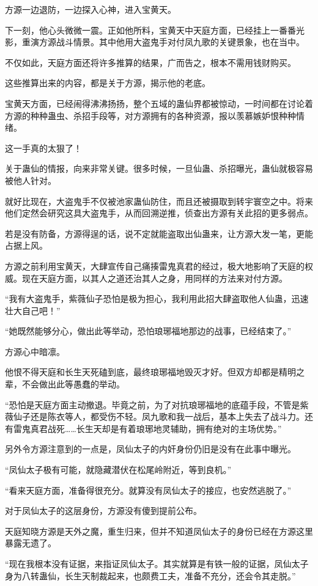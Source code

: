 \begin{this_body}
方源一边退防，一边探入心神，进入宝黄天。

下一刻，他心头微微一震。正如他所料，宝黄天中天庭方面，已经挂上一番番光影，重演方源战斗情景。其中他用大盗鬼手对付凤九歌的关键景象，也在当中。

不仅如此，天庭方面还将许多推算的结果，广而告之，根本不需用钱财购买。

这些推算出来的内容，都是关于方源，揭示他的老底。

宝黄天方面，已经闹得沸沸扬扬，整个五域的蛊仙界都被惊动，一时间都在讨论着方源的种种蛊虫、杀招手段等，对方源拥有的各种资源，报以羡慕嫉妒恨种种情绪。

这一手真的太狠了！

关于蛊仙的情报，向来非常关键。很多时候，一旦仙蛊、杀招曝光，蛊仙就极容易被他人针对。

就好比现在，大盗鬼手不仅被池家蛊仙防住，而且还被摄取到转宇寰空之中。将来他们定然会研究这具大盗鬼手，从而回溯逆推，侦查出方源有关此招的更多弱点。

若是没有防备，方源得逞的话，说不定就能盗取出仙蛊来，让方源大发一笔，更能占据上风。

方源之前利用宝黄天，大肆宣传自己痛揍雷鬼真君的经过，极大地影响了天庭的权威。现在天庭方面，以其人之道还治其人之身，用同样的方法来对付方源。

“我有大盗鬼手，紫薇仙子恐怕是极为担心，我利用此招大肆盗取他人仙蛊，迅速壮大自己吧！”

“她既然能够分心，做出此等举动，恐怕琅琊福地那边的战事，已经结束了。”

方源心中暗凛。

他恨不得天庭和长生天死磕到底，最终琅琊福地毁灭才好。但双方却都是精明之辈，不会做出此等愚蠢的举动。

“恐怕是天庭方面主动撤退。毕竟之前，为了对抗琅琊福地的底蕴手段，不管是紫薇仙子还是陈衣等人，都受伤不轻。凤九歌和我一战后，基本上失去了战斗力。还有雷鬼真君战死……长生天却是有着琅琊地灵辅助，拥有绝对的主场优势。”

另外令方源注意到的一点是，凤仙太子的内奸身份仍旧是没有在此事中曝光。

“凤仙太子极有可能，就隐藏潜伏在松尾岭附近，等到良机。”

“看来天庭方面，准备得很充分。就算没有凤仙太子的接应，也安然逃脱了。”

对于凤仙太子的这层身份，方源没有傻到提前公布。

天庭知晓方源是天外之魔，重生归来，但并不知道凤仙太子的身份已经在方源这里暴露无遗了。

“现在我根本没有证据，来指证凤仙太子。其实就算是有铁一般的证据，凤仙太子身为八转蛊仙，长生天制裁起来，也颇费工夫，准备不充分，还会令其走脱。”


\end{this_body}
